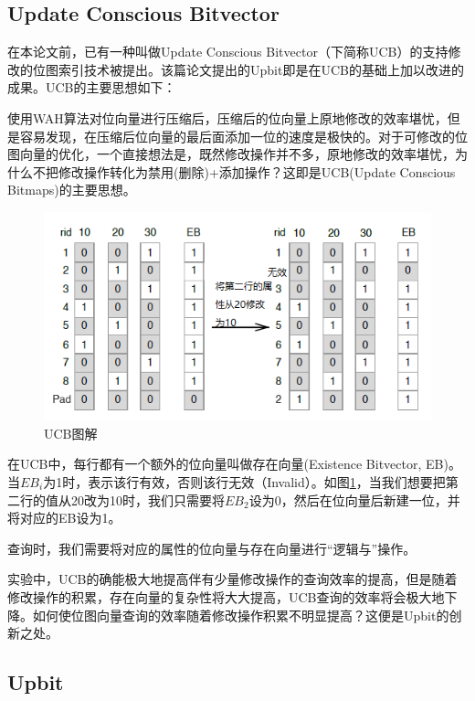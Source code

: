 \documentclass[11pt, a4paper]{article}
\begin{document}
  \subsection{Update Conscious Bitvector}

  在本论文前，已有一种叫做Update Conscious Bitvector（下简称UCB）的支持修改的位图索引技术被提出。该篇论文提出的Upbit即是在UCB的基础上加以改进的成果。UCB的主要思想如下：


  使用WAH\cite{art5}算法对位向量进行压缩后，压缩后的位向量上原地修改的效率堪忧，但是容易发现，在压缩后位向量的最后面添加一位的速度是极快的。对于可修改的位图向量的优化，一个直接想法是，既然修改操作并不多，原地修改的效率堪忧，为什么不把修改操作转化为禁用(删除)+添加操作？这即是UCB(Update Conscious Bitmaps)的主要思想。

  \begin{figure}[H]
    \begin{center}
      \includegraphics[width=5in]{ucb.png}
      \caption{UCB图解} \label{fig:ucb}
    \end{center}
  \end{figure}

  在UCB中，每行都有一个额外的位向量叫做存在向量(Existence Bitvector, EB)。当$EB_i$为1时，表示该行有效，否则该行无效（Invalid）。如图\ref{fig:ucb}，当我们想要把第二行的值从20改为10时，我们只需要将$EB_2$设为0，然后在位向量后新建一位，并将对应的EB设为1。

  查询时，我们需要将对应的属性的位向量与存在向量进行“逻辑与”操作。

  实验中，UCB的确能极大地提高伴有少量修改操作的查询效率的提高，但是随着修改操作的积累，存在向量的复杂性将大大提高，UCB查询的效率将会极大地下降。如何使位图向量查询的效率随着修改操作积累不明显提高？这便是Upbit的创新之处。

  \subsection{Upbit}
\end{document}

